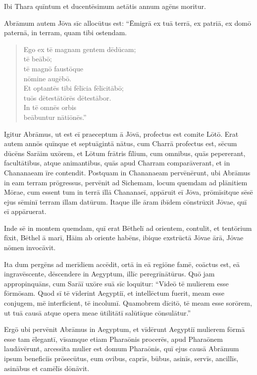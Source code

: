 \Versus Ibi Thara quīntum et ducentēsimum aetātis annum agēns moritur.



\Caput
\Versus Abrāmum autem Jōva sīc allocūtus est: ``Ēmigrā ex tuā terrā, ex patriā, ex domō paternā, in terram, quam tibi ostendam.

\begin{verse}
\begin{patverse*}
\Versus Ego ex tē magnam gentem dēdūcam; \\
tē beābō; \\
tē magnō faustōque \\
nōmine augēbō.\\
\Versus Et optantēs tibi fēlīcia fēlīcitābō; \\
tuōs dētestātōrēs dētestābor. \\
In tē omnēs orbis \\
beābuntur nātiōnēs.''
\end{patverse*}
\end{verse}

\Versus Igitur Abrāmus, ut est eī praeceptum ā Jōvā, profectus est comite Lōtō. Erat autem annōs quīnque et septuāgintā nātus, cum Charrā profectus est,
\Versus sēcum dūcēns Sarāim uxōrem, et Lōtum frātris fīlium, cum omnibus, quās pepererant, facultātibus, atque animantibus, quās apud Charram comparāverant, et in Chananaeam īre contendit. Postquam in Chananaeam pervēnērunt,
\Versus ubi Abrāmus in eam terram prōgressus, pervēnit ad Sichemam, locum quemdam ad plānitiem Mōrae, cum essent tum in terrā illā Chananaeī,
\Versus appāruit eī Jōva, prōmīsitque sēsē ejus sēminī terram illam datūrum. Itaque ille āram ibīdem cōnstrūxit Jōvae, quī eī appāruerat.

\Versus Inde sē in montem quemdam, quī erat Bēthelī ad orientem, contulit, et tentōrium fīxit, Bēthel ā marī, Hāim ab oriente habēns, ibique exstrūctā Jōvae ārā, Jōvae nōmen invocāvit.

\Versus Ita dum pergēns ad merīdiem accēdit,
\Versus ortā in eā regiōne famē, coāctus est, eā ingravēscente, dēscendere in Aegyptum, illīc peregrīnātūrus.
\Versus Quō jam appropinquāns, cum Sarāī uxōre suā sīc loquitur: ``Videō tē mulierem esse fōrmōsam.
\Versus Quod sī tē vīderint Aegyptiī, et intellēctum fuerit, meam esse conjugem, mē interficient, tē incolumī.
\Versus Quamobrem dīcitō, tē meam esse sorōrem, ut tuā causā atque opera meae ūtilitātī salūtīque cōnsulātur.''

\Versus Ergō ubi pervēnit Abrāmus in Aegyptum, et vīdērunt Aegyptiī mulierem fōrmā esse tam ēlegantī,
\Versus vīsamque etiam Pharaōnis procerēs, apud Pharaōnem laudāvērunt, arcessīta mulier est domum Pharaōnis,
\Versus quī ejus causā Abrāmum ipsum beneficiīs prōsecūtus, eum ovibus, caprīs, būbus, asinīs, servīs, ancillīs, asinābus et camēlīs dōnāvit.

